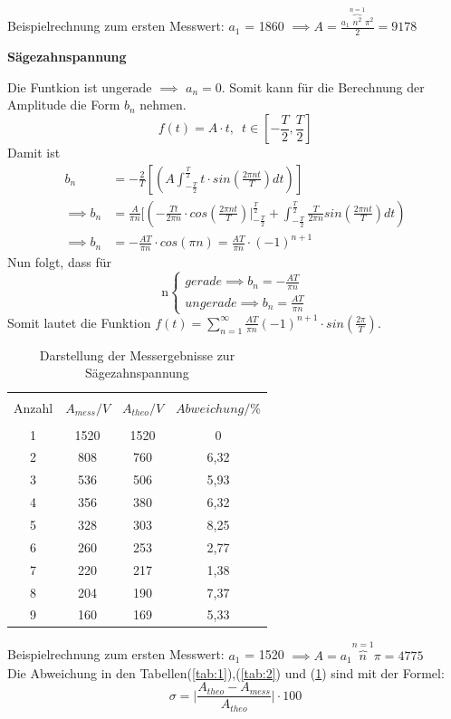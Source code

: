 Beispielrechnung zum ersten Messwert: $a_1$ = 1860 $\implies A =\frac{a_1 \overbrace{n^2}^{n=1} \pi^2}{2}= 9178$\\
\centerline{\textbf{Sägezahnspannung}}
Die Funtkion ist ungerade $\implies$ $a_n = 0$.
Somit kann für die Berechnung der Amplitude die Form $b_n$ nehmen.
\begin{equation*}
f(t) = A\cdot t , \,\,\, t\in [-\frac{T}{2},\frac{T}{2}]
\end{equation*}
Damit ist
\begin{align*}
  b_n &= -\frac{2}{T} [(A \int_{-\frac{T}{2}}^{\frac{T}{2}} t\cdot sin(\frac{2\pi nt}{T})dt)]\\
\implies b_n &=\frac{A}{\pi n} [(-\frac{Tt}{2\pi n} \cdot cos(\frac{2\pi nt}{T})\bigl|_{-\frac{T}{2}}^{\frac{T}{2}} + \int_{-\frac{T}{2}}^{\frac{T}{2}} \frac{T}{2\pi n} sin(\frac{2\pi nt}{T})dt) \\
\implies b_n &= -\frac{AT}{\pi n}\cdot cos(\pi n) = \frac{AT}{\pi n}\cdot (-1)^{n+1}
\end{align*}
Nun folgt, dass für
\begin{equation*}
  \text{n}
  \begin{cases}
    gerade \implies b_n = -\frac{AT}{\pi n}\,\, \\
    ungerade \implies b_n =\frac{AT}{\pi n}
  \end{cases}
\end{equation*}
Somit lautet die Funktion $f(t) = \sum^{\infty}_{n=1} \frac{AT}{\pi n}(-1)^{n+1} \cdot sin(\frac{2\pi}{T})$.
\begin{table}[H]
  \centering
  \begin{tabular}{c c c c}
    \toprule\\
    Anzahl & $A_{mess} / V$ & $A_{theo} / V$ & $Abweichung / \% $\\
    \midrule \\
    1 & 1520 & 1520 & 0\\
    2 & 808 & 760 & 6,32\\
    3 & 536 & 506 & 5,93\\
    4 & 356 & 380 & 6,32\\
    5 & 328 & 303 & 8,25\\
    6 & 260 & 253 & 2,77\\
    7 & 220 & 217 & 1,38\\
    8 & 204 & 190 & 7,37\\
    9 & 160 & 169 & 5,33\\
    \bottomrule
  \end{tabular}
  \caption{Darstellung der Messergebnisse zur Sägezahnspannung}
  \label{tab:3}
\end{table}
Beispielrechnung zum ersten Messwert: $a_1$ = 1520 $\implies A =a_1 \overbrace{n}^{n=1} \pi = 4775$\\
Die Abweichung in den Tabellen(\ref{tab:1}),(\ref{tab:2}) und (\ref{tab:3}) sind mit der Formel:
\begin{equation*}
  \sigma = \biggl| \frac{A_{theo}-A_{mess}}{A_{theo}} \biggl| \cdot 100
\end{equation*}
